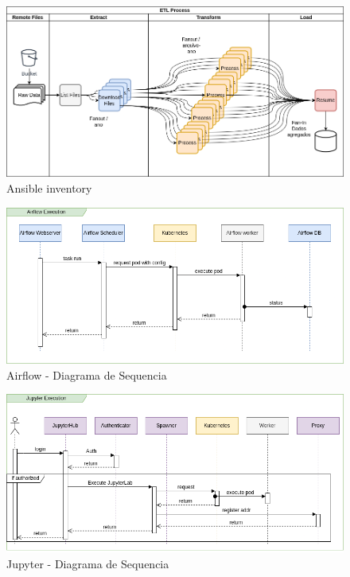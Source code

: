 \documentclass[10pt,brazil]{beamer}
\theoremstyle{definition}
\begin{document}
\begin{frame}[plain]
  \hspace*{-10mm}
    \begin{figure}
    \centering  
  \includegraphics[width=.85\paperwidth]{etl_process.png}
      \caption[Ansible inventory]{Ansible inventory}
  \end{figure}  
\end{frame}

\begin{frame}[plain]
  \hspace*{-10mm}
    \begin{figure}
    \centering  
  \includegraphics[width=.85\paperwidth]{airflow_sequence.png}
      \caption[Airflow - Diagrama de Sequencia]{Airflow - Diagrama de Sequencia}
  \end{figure}  
\end{frame}

\begin{frame}[plain]
  \hspace*{-10mm}
    \begin{figure}
    \centering  
  \includegraphics[width=.85\paperwidth]{jupyter_sequence.png}
      \caption[Jupyter - Diagrama de Sequencia]{Jupyter - Diagrama de Sequencia}
  \end{figure}  
\end{frame}
\end{document}
